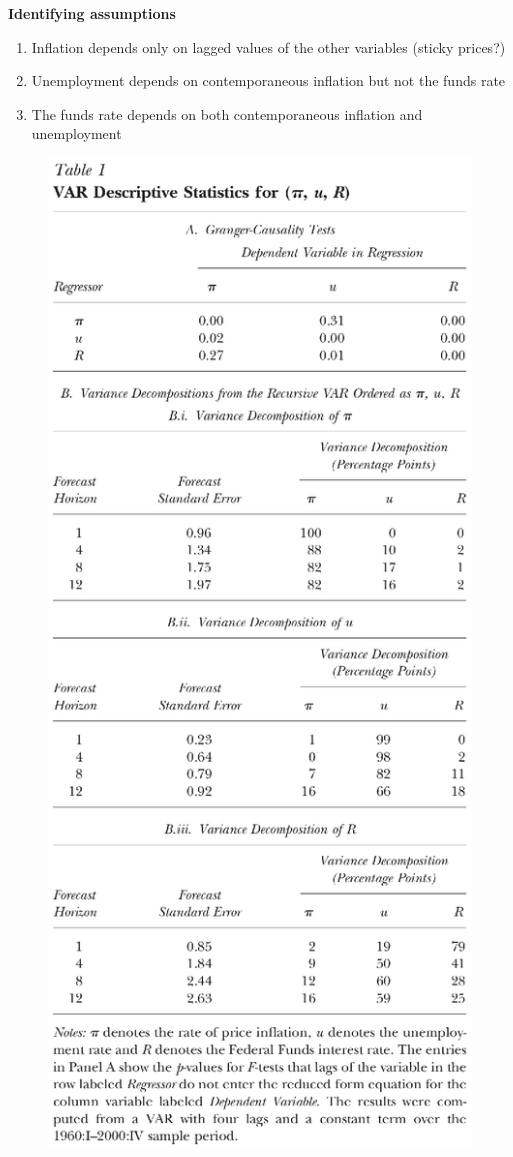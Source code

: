 \documentclass{beamer}
\begin{document}
\begin{frame}
  \textbf{Identifying assumptions}
\begin{enumerate}
  \item Inflation depends only on lagged values of the other variables (sticky prices?)
  \item Unemployment depends on contemporaneous inflation but not the funds rate
  \item The funds rate depends on both contemporaneous inflation and unemployment
\end{enumerate}
\end{frame}

\begin{frame}
  \begin{figure}
    \includegraphics[scale=.4]{stock_watson.eps}

\end{figure}
\end{frame}
\end{document}
